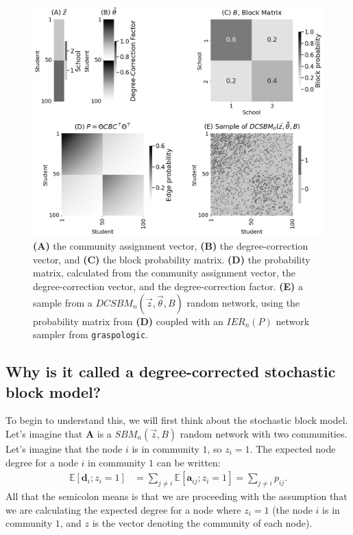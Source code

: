 \begin{figure}[h]
    \centering
    \includegraphics[width=0.9\linewidth]{representations/ch5/Images/dcsbm.png}
    \caption[Parameters of $DCSBM_n(\vec z, \vec \theta, B)$ random network]{\textbf{(A)} the community assignment vector, \textbf{(B)} the degree-correction vector, and \textbf{(C)} the block probability matrix. \textbf{(D)} the probability matrix, calculated from the community assignment vector, the degree-correction vector, and the degree-correction factor. \textbf{(E)} a sample from a $DCSBM_n(\vec z, \vec \theta, B)$ random network, using the probability matrix from \textbf{(D)} coupled with an $IER_n(P)$ network sampler from \texttt{graspologic}.}
    \label{fig:ch5:dcsbm}
\end{figure}

\subsection{Why is it called a degree-corrected stochastic block model?}

To begin to understand this, we will first think about the stochastic block model. Let's imagine that $\mathbf A$ is a $SBM_n(\vec z, B)$ random network with two communities. Let's imagine that the node $i$ is in community $1$, so $z_i = 1$. The expected node degree for a node $i$ in community $1$ can be written:
\begin{align*}
    \mathbb E[\mathbf d_i ; z_i = 1] &= \sum_{j \neq i} \mathbb E[\mathbf a_{ij}; z_i = 1] = \sum_{j \neq i}p_{ij}.
\end{align*}
All that the semicolon means is that we are proceeding with the assumption that we are calculating the expected degree for a node where $z_i = 1$ (the node $i$ is in community $1$, and $z$ is the vector denoting the community of each node). 

